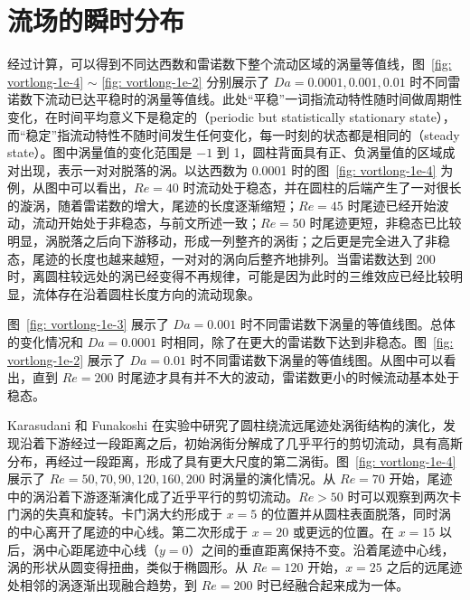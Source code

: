 \section{流场的瞬时分布}\label{sec: transient}

经过计算，可以得到不同达西数和雷诺数下整个流动区域的涡量等值线，图~\ref{fig: vortlong-1e-4} $\sim$ \ref{fig: vortlong-1e-2} 分别展示了 $Da=0.0001,0.001,0.01$ 时不同雷诺数下流动已达平稳时的涡量等值线。此处“平稳”一词指流动特性随时间做周期性变化，在时间平均意义下是稳定的（periodic but statistically stationary state），而“稳定”指流动特性不随时间发生任何变化，每一时刻的状态都是相同的（steady state）。图中涡量值的变化范围是 $-1$ 到 1，圆柱背面具有正、负涡量值的区域成对出现，表示一对对脱落的涡。以达西数为 0.0001 时的图~\ref{fig: vortlong-1e-4} 为例，从图中可以看出，$Re=40$ 时流动处于稳态，并在圆柱的后端产生了一对很长的漩涡，随着雷诺数的增大，尾迹的长度逐渐缩短；$Re=45$ 时尾迹已经开始波动，流动开始处于非稳态，与前文所述一致；$Re=50$ 时尾迹更短，非稳态已比较明显，涡脱落之后向下游移动，形成一列整齐的涡街；之后更是完全进入了非稳态，尾迹的长度也越来越短，一对对的涡向后整齐地排列。当雷诺数达到 200 时，离圆柱较远处的涡已经变得不再规律，可能是因为此时的三维效应已经比较明显，流体存在沿着圆柱长度方向的流动现象。

图~\ref{fig: vortlong-1e-3} 展示了 $Da=0.001$ 时不同雷诺数下涡量的等值线图。总体的变化情况和 $Da=0.0001$ 时相同，除了在更大的雷诺数下达到非稳态。图~\ref{fig: vortlong-1e-2} 展示了 $Da=0.01$ 时不同雷诺数下涡量的等值线图。从图中可以看出，直到 $Re=200$ 时尾迹才具有并不大的波动，雷诺数更小的时候流动基本处于稳态。

Karasudani 和 Funakoshi\cite{Karasudani1994} 在实验中研究了圆柱绕流远尾迹处涡街结构的演化，发现沿着下游经过一段距离之后，初始涡街分解成了几乎平行的剪切流动，具有高斯分布，再经过一段距离，形成了具有更大尺度的第二涡街。图~\ref{fig: vortlong-1e-4} 展示了 $Re=50,70,90,120,160,200$ 时涡量的演化情况。从 $Re=70$ 开始，尾迹中的涡沿着下游逐渐演化成了近乎平行的剪切流动。$Re>50$ 时可以观察到两次卡门涡的失真和旋转。卡门涡大约形成于 $x=5$ 的位置并从圆柱表面脱落，同时涡的中心离开了尾迹的中心线。第二次形成于 $x=20$ 或更远的位置。在 $x=15$ 以后，涡中心距尾迹中心线（$y=0$）之间的垂直距离保持不变。沿着尾迹中心线，涡的形状从圆变得扭曲，类似于椭圆形。从 $Re=120$ 开始，$x=25$ 之后的远尾迹处相邻的涡逐渐出现融合趋势，到 $Re=200$ 时已经融合起来成为一体。

